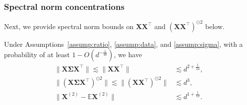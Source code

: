 \documentclass[twoside,11pt]{article}
\newcommand{\E}{\mathbb{E}}
\def\bX{{\boldsymbol X}}
\def\bSigma{{\boldsymbol \Sigma}}
\newcommand{\1}{\mathbf{1}}
\def\tran{^\top}
\begin{document}
\subsubsection{Spectral norm concentrations}
Next, we provide spectral norm bounds on $\bX\bX^\top$ and $(\bX\bX\tran)^{\odot 2}$ below.  
\begin{lemma}\label{lem:bound_XX_2}
Under Assumptions~\ref{assump:ratio}, \ref{assump:data}, and \ref{assump:sigma}, with a probability of at least $1-O(d^{-\frac{1}{48}})$,  we have 
 \begin{align}
     \|\bX\bSigma\bX\tran \| \lesssim  \| \bX\bX^\top\|&\lesssim d^{2+\frac{1}{24}}, \label{eq:XXconcentration}\\
  \|(\bX\bSigma\bX\tran)^{\odot 2}\| \lesssim \|(\bX\bX\tran)^{\odot 2}\| &\lesssim  d^{3},\label{eq:XX2concentration}\\
  \|\bX^{(2)}-\E\bX^{(2)}\|&\lesssim  d^{1+\frac{1}{12}}.\label{eq:X2centered_concentration}
   \end{align}
\end{lemma}
\end{document}

